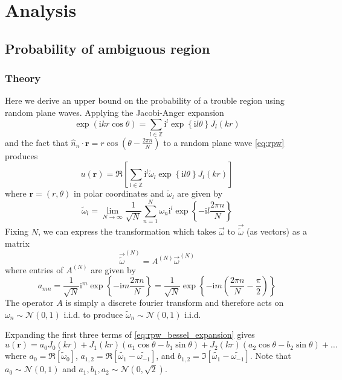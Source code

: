 \documentclass{report}
\newcommand{\rr}[0]{\mathbf{r}}
\begin{document}
\section{Analysis}

\subsection{Probability of ambiguous region}

\subsubsection{Theory}
Here we derive an upper bound on the probability of a trouble region using random plane waves. Applying the Jacobi-Anger expansion \cite{abramowitz}
\[
\exp(\mathrm{i} k r \cos \theta) = \sum_{l \in \mathbb{Z}} \mathrm{i}^{l} \exp{\left\{\mathrm{i} l \theta \right\}} J_{l}(kr)
\]
and the fact that $\hat{n}_{n} \cdot \rr = r \cos{ \left( \theta - \frac{2 \pi n}{N} \right) }$ to a random plane wave \ref{eq:rpw} produces
\begin{equation}
  \label{eq:rpw_bessel_expansion}
  u(\rr) = \Re \left[ \sum_{l \in \mathbb{Z}} \mathrm{i}^{l} \tilde{\omega}_{l} \exp{\left\{\mathrm{i} l \theta \right\}} J_{l}(kr) \right]
\end{equation}
where $\rr = (r, \theta)$ in polar coordinates and $\tilde{\omega}_{l}$ are given by
\[
\tilde{\omega}_{l} = \lim_{N \rightarrow \infty} \frac{1}{\sqrt{N}} \sum_{n=1}^{N} \omega_{n} \mathrm{i}^{l} \exp{\left\{-\mathrm{i} l \frac{2 \pi n}{N} \right\}}
\]
Fixing $N$, we can express the transformation which takes $\overrightarrow{\omega}$ to $\overrightarrow{\tilde{\omega}}$ (as vectors) as a matrix
\[
\overrightarrow{\tilde{\omega}}^{(N)} = A^{(N)} \overrightarrow{\omega}^{(N)}
\]
where entries of $A^{(N)}$ are given by
\[
a_{mn} = \frac{1}{\sqrt{N}} \mathrm{i}^{m} \exp{\left\{-\mathrm{i} m \frac{2 \pi n}{N} \right\}} = \frac{1}{\sqrt{N}} \exp{\left\{-\mathrm{i} m \left(\frac{2 \pi n}{N} - \frac{\pi}{2}\right) \right\}} 
\]
The operator $A$ is simply a discrete fourier transform and therefore acts on $\omega_{n} \sim \mathcal{N}(0,1)$ i.i.d. to produce $\tilde{\omega}_{n} \sim \mathcal{N}(0, 1)$ i.i.d.

Expanding the first three terms of \ref{eq:rpw_bessel_expansion} gives
\[
u(\rr) = a_{0} J_{0}(kr) + J_{1}(kr) (a_{1} \cos{\theta} - b_{1} \sin{\theta}) + J_{2}(kr) (a_{2} \cos{\theta} - b_{2} \sin{\theta}) + \ldots
\]
where $a_{0} = \Re \left[ \tilde{\omega}_{0} \right]$, $a_{1,2} = \Re \left[ \tilde{\omega_{1}} - \tilde{\omega_{-1}} \right]$, and $b_{1,2} = \Im \left[ \tilde{\omega_{1}} - \tilde{\omega_{-1}} \right]$. Note that $a_{0} \sim \mathcal{N}(0,1)$ and $a_{1}, b_{1}, a_{2} \sim \mathcal{N}(0,\sqrt{2})$.
\end{document}
